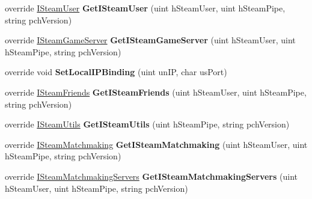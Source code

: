 \begin{DoxyCompactItemize}
override \hyperlink{class_valve_1_1_steamworks_1_1_i_steam_user}{I\+Steam\+User} {\bfseries Get\+I\+Steam\+User} (uint h\+Steam\+User, uint h\+Steam\+Pipe, string pch\+Version)
\item 
\mbox{\label{class_valve_1_1_steamworks_1_1_c_steam_client_a388aa1fceee9481445b14b5a7a18bda0}} 
override \hyperlink{class_valve_1_1_steamworks_1_1_i_steam_game_server}{I\+Steam\+Game\+Server} {\bfseries Get\+I\+Steam\+Game\+Server} (uint h\+Steam\+User, uint h\+Steam\+Pipe, string pch\+Version)
\item 
\mbox{\label{class_valve_1_1_steamworks_1_1_c_steam_client_a636c367a49500dbd397f4d762f68a090}} 
override void {\bfseries Set\+Local\+I\+P\+Binding} (uint un\+IP, char us\+Port)
\item 
\mbox{\label{class_valve_1_1_steamworks_1_1_c_steam_client_ab034d5dba7c18482a604fdfff37f2f43}} 
override \hyperlink{class_valve_1_1_steamworks_1_1_i_steam_friends}{I\+Steam\+Friends} {\bfseries Get\+I\+Steam\+Friends} (uint h\+Steam\+User, uint h\+Steam\+Pipe, string pch\+Version)
\item 
\mbox{\label{class_valve_1_1_steamworks_1_1_c_steam_client_a729f7d0cb66765407234c2ba680f8ffe}} 
override \hyperlink{class_valve_1_1_steamworks_1_1_i_steam_utils}{I\+Steam\+Utils} {\bfseries Get\+I\+Steam\+Utils} (uint h\+Steam\+Pipe, string pch\+Version)
\item 
\mbox{\label{class_valve_1_1_steamworks_1_1_c_steam_client_ad7235c8e6223bf547a2ace14032605c6}} 
override \hyperlink{class_valve_1_1_steamworks_1_1_i_steam_matchmaking}{I\+Steam\+Matchmaking} {\bfseries Get\+I\+Steam\+Matchmaking} (uint h\+Steam\+User, uint h\+Steam\+Pipe, string pch\+Version)
\item 
\mbox{\label{class_valve_1_1_steamworks_1_1_c_steam_client_ae04f27fbaed7609d5bd1f4adbb83ed8b}} 
override \hyperlink{class_valve_1_1_steamworks_1_1_i_steam_matchmaking_servers}{I\+Steam\+Matchmaking\+Servers} {\bfseries Get\+I\+Steam\+Matchmaking\+Servers} (uint h\+Steam\+User, uint h\+Steam\+Pipe, string pch\+Version)

\end{DoxyCompactItemize}

